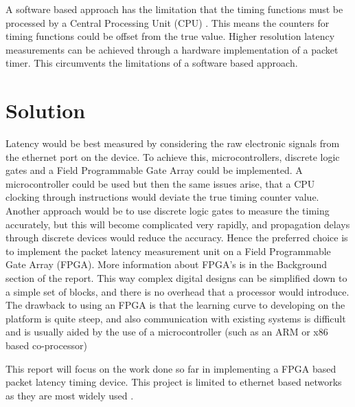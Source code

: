\par A software based approach has the limitation that the timing functions must be processed by a
Central Processing Unit (CPU) \cite{CPUtiming}. This means the counters for timing functions could be offset from the true value. Higher
resolution latency measurements can be achieved through a hardware implementation of a packet
timer. This circumvents the limitations of a software based approach.

\section{Solution}

Latency would be best measured by considering the raw electronic signals from the ethernet port on
the device. To achieve this, microcontrollers, discrete logic gates and a Field Programmable Gate
Array could be implemented. A microcontroller could be used but then the same issues arise, that a
CPU clocking through instructions would deviate the true timing counter value. Another approach
would be to use discrete logic gates to measure the timing accurately, but this will become 
complicated very rapidly, and propagation delays through discrete devices would reduce the 
accuracy. Hence the preferred choice is to implement the packet latency measurement unit on 
a Field Programmable Gate Array (FPGA). More information about FPGA’s is in the Background 
section of the report. This way complex digital designs can be simplified down to a simple 
set of blocks, and there is no overhead that a processor would introduce. The drawback to using an
FPGA is that the learning curve to developing on the platform is quite steep, and also communication with 
existing systems is difficult and is usually aided by the use of a microcontroller (such as an ARM or x86 based co-processor)

\par This report will focus on the work done so far in implementing a FPGA based packet latency timing
device. This project is limited to ethernet based networks as they are most widely used \cite{etherneteverywhere}.

